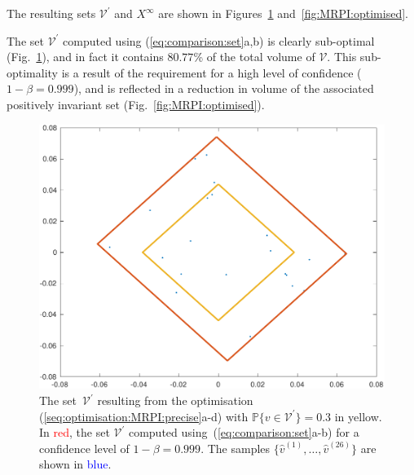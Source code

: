 \documentclass{ifacconf}
\providecommand{\V}{\mathcal V}
\providecommand{\PP}{\mathbb P}
\begin{document}
The resulting sets $\V^\prime$ and $X^\infty$ are shown in Figures~\ref{figure:V:prime:and:comparison} and~\ref{fig:MRPI:optimised}. 

%
The set $\V^\prime$ computed using (\ref{eq:comparison:set}a,b) is clearly sub-optimal (Fig.~\ref{figure:V:prime:and:comparison}), and in fact it contains $80.77$\% of the total volume of $\V$.
%
This sub-optimality is a result of the requirement for a high level of confidence ($1-\beta = 0.999$), and is reflected in a reduction in volume of the associated positively invariant set (Fig.~\ref{fig:MRPI:optimised}).

%
\begin{figure}
\includegraphics[width=0.99\linewidth]{Vprime.pdf}
\caption{The set~$\V^\prime$ resulting from the optimisation \mbox{(\ref{seq:optimisation:MRPI:precise}a-d)} with $\PP\{v\in\V^\prime\}=0.3$ in \textcolor[rgb]{0.9255,0.6902,0.2078}{yellow}. 
%
In \textcolor{red}{red}, the set $\V^\prime$ computed using~(\ref{eq:comparison:set}a-b) for a confidence level of $1-\beta=0.999$. 
%
The samples $\{\hat{v}^{(1)},\ldots,\hat{v}^{(26)}\}$ are shown in \textcolor{blue}{blue}.}
\label{figure:V:prime:and:comparison}
\end{figure}
\end{document}
